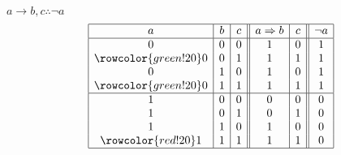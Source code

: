 \documentclass{article}
\begin{document}
\begin{enumerate}[label=(\alph*)]
\begin{enumerate}[label=\roman*.]
        $a\rightarrow{}b,c\therefore{}\neg{}a$
        \begin{displaymath}
            \begin{array}{|c|c|c||c|c||c|}
            \hline
               a
             & b
             & c
             & a\Rightarrow{}b
             & c
             & \lnot{}a \\
            \hline
            0 & 0 & 0 & 1 & 0 & 1 \\
            \rowcolor{green!20}
            0 & 0 & 1 & 1 & 1 & 1 \\
            0 & 1 & 0 & 1 & 0 & 1 \\
            \rowcolor{green!20}
            0 & 1 & 1 & 1 & 1 & 1 \\
            \hline
            1 & 0 & 0 & 0 & 0 & 0 \\
            1 & 0 & 1 & 0 & 1 & 0 \\
            1 & 1 & 0 & 1 & 0 & 0 \\
            \rowcolor{red!20}
            1 & 1 & 1 & 1 & 1 & 0 \\
            \hline
            \end{array}
        \end{displaymath}
                
    \end{enumerate}

\end{enumerate}
\end{document}
